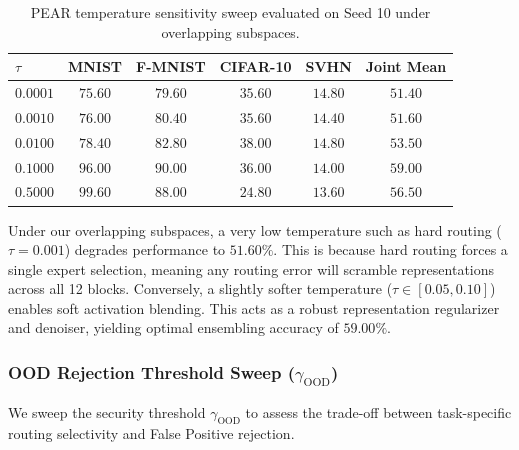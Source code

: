 \begin{table}[h]
\caption{PEAR temperature sensitivity sweep evaluated on Seed 10 under overlapping subspaces.}
\label{tab:temp_sweep}
\vskip 0.15in
\begin{center}
\begin{scriptsize}
\begin{sc}
\setlength{\tabcolsep}{3pt}
\begin{tabular}{lccccc}
\toprule
$\tau$ & MNIST & F-MNIST & CIFAR-10 & SVHN & Joint Mean \\
\midrule
$0.0001$ & $75.60$ & $79.60$ & $35.60$ & $14.80$ & $\mathbf{51.40}$ \\
$0.0010$ & $76.00$ & $80.40$ & $35.60$ & $14.40$ & $\mathbf{51.60}$ \\
$0.0100$ & $78.40$ & $82.80$ & $38.00$ & $14.80$ & $\mathbf{53.50}$ \\
$0.1000$ & $96.00$ & $90.00$ & $36.00$ & $14.00$ & $\mathbf{59.00}$ \\
$0.5000$ & $99.60$ & $88.00$ & $24.80$ & $13.60$ & $\mathbf{56.50}$ \\
\bottomrule
\end{tabular}
\end{sc}
\end{scriptsize}
\end{center}
\vskip -0.1in
\end{table}

Under our overlapping subspaces, a very low temperature such as hard routing ($\tau = 0.001$) degrades performance to $51.60\%$. This is because hard routing forces a single expert selection, meaning any routing error will scramble representations across all 12 blocks. Conversely, a slightly softer temperature ($\tau \in [0.05, 0.10]$) enables soft activation blending. This acts as a robust representation regularizer and denoiser, yielding optimal ensembling accuracy of $59.00\%$.

\subsubsection{OOD Rejection Threshold Sweep ($\gamma_{\text{OOD}}$)}
We sweep the security threshold $\gamma_{\text{OOD}}$ to assess the trade-off between task-specific routing selectivity and False Positive rejection.

